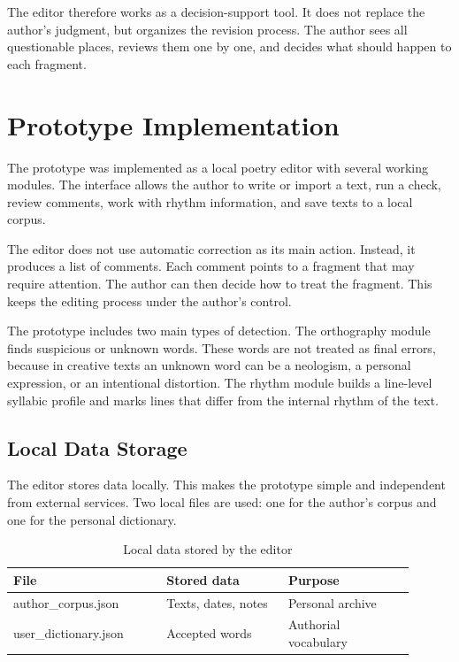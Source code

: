 \documentclass[sigconf]{acmart}
\begin{document}
The editor therefore works as a decision-support tool. It does not replace the author's judgment, but organizes the revision process. The author sees all questionable places, reviews them one by one, and decides what should happen to each fragment.

\section{Prototype Implementation}

The prototype was implemented as a local poetry editor with several working modules. The interface allows the author to write or import a text, run a check, review comments, work with rhythm information, and save texts to a local corpus.

The editor does not use automatic correction as its main action. Instead, it produces a list of comments. Each comment points to a fragment that may require attention. The author can then decide how to treat the fragment. This keeps the editing process under the author's control.

The prototype includes two main types of detection. The orthography module finds suspicious or unknown words. These words are not treated as final errors, because in creative texts an unknown word can be a neologism, a personal expression, or an intentional distortion. The rhythm module builds a line-level syllabic profile and marks lines that differ from the internal rhythm of the text.

\subsection{Local Data Storage}

The editor stores data locally. This makes the prototype simple and independent from external services. Two local files are used: one for the author's corpus and one for the personal dictionary.

\begin{table}[h]
\caption{Local data stored by the editor}
\label{tab:local-data}
\begin{tabular}{p{0.34\linewidth}p{0.27\linewidth}p{0.29\linewidth}}
\toprule
File & Stored data & Purpose \\
\midrule
author\_corpus.json & Texts, dates, notes & Personal archive \\
user\_dictionary.json & Accepted words & Authorial vocabulary \\
\bottomrule
\end{tabular}
\end{table}
\end{document}
